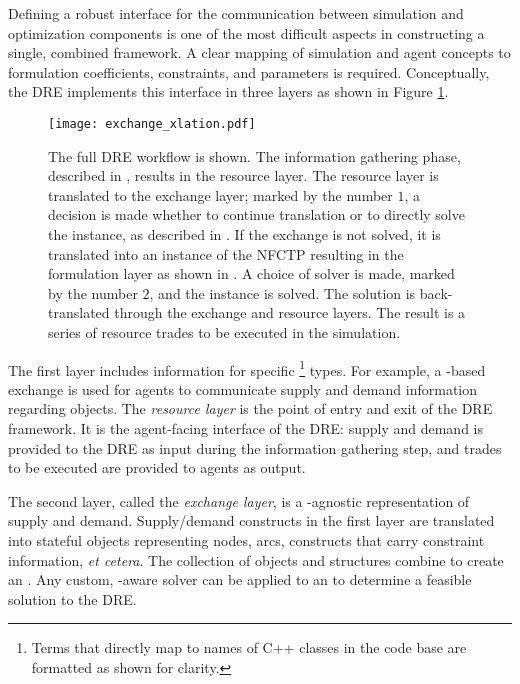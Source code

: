 Defining a robust interface for the communication between simulation and
optimization components is one of the most difficult aspects in constructing a
single, combined framework. A clear mapping of simulation and agent concepts to
formulation coefficients, constraints, and parameters is required. Conceptually,
the DRE implements this interface in three layers as shown in Figure
\ref{fig:dre_impl}.

\begin{figure}
  \begin{center}
    \texttt{[image: exchange\_xlation.pdf]}
    \caption[]{
      \label{fig:dre_impl}
      The full DRE workflow is shown. The information gathering phase, described
      in , results in the resource layer. The resource
      layer is translated to the exchange layer; marked by the number $1$, a
      decision is made whether to continue translation or to directly solve the
      instance, as described in . If the exchange is
      not solved, it is translated into an instance of the NFCTP resulting in
      the formulation layer as shown in . A choice of
      solver is made, marked by the number $2$, and the instance is solved.  The
      solution is back-translated through the exchange and resource layers. The
      result is a series of resource trades to be executed in the simulation.}
  \end{center}
\end{figure}

The first layer includes information for specific
 \footnote{Terms that directly map to names of C++ classes in the
  \Cyclus code base are formatted as shown for clarity.} types. For example, a
-based exchange is used for agents to communicate supply and
demand information regarding  objects. The \textit{resource
  layer} is the point of entry and exit of the DRE framework. It is the
agent-facing interface of the DRE: supply and demand is provided to the DRE as
input during the information gathering step, and trades to be executed are
provided to agents as output.

The second layer, called the \textit{exchange layer}, is a
-agnostic representation of supply and demand. Supply/demand
constructs in the first layer are translated into stateful objects representing
nodes, arcs, constructs that carry constraint information, \textit{et
  cetera}. The collection of objects and structures combine to create an
. Any custom, \Cyclus-aware solver can be applied to an
 to determine a feasible solution to the DRE.

